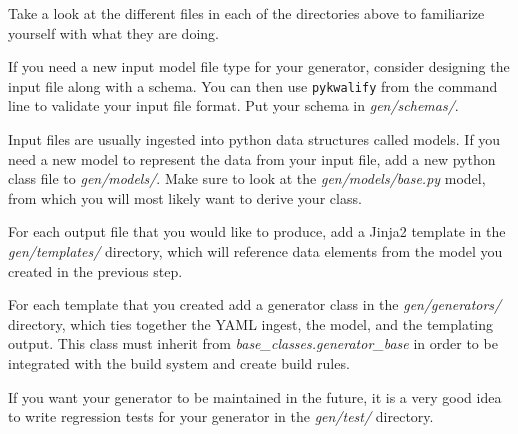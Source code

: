 \vspace{5mm} %
\begin{spacedenumerate}
  \item Take a look at the different files in each of the directories above to familiarize yourself with what they are doing.
  \item If you need a new input model file type for your generator, consider designing the input file along with a schema. You can then use \texttt{pykwalify} from the command line to validate your input file format. Put your schema in \textit{gen/schemas/}.
  \item Input files are usually ingested into python data structures called models. If you need a new model to represent the data from your input file, add a new python class file to \textit{gen/models/}. Make sure to look at the \textit{gen/models/base.py} model, from which you will most likely want to derive your class.
  \item For each output file that you would like to produce, add a Jinja2 template in the \textit{gen/templates/} directory, which will reference data elements from the model you created in the previous step.
  \item For each template that you created add a generator class in the \textit{gen/generators/} directory, which ties together the YAML ingest, the model, and the templating output. This class must inherit from \textit{base\_classes.generator\_base} in order to be integrated with the build system and create build rules.
  \item If you want your generator to be maintained in the future, it is a very good idea to write regression tests for your generator in the \textit{gen/test/} directory.
\end{spacedenumerate}
\vspace{5mm} %

